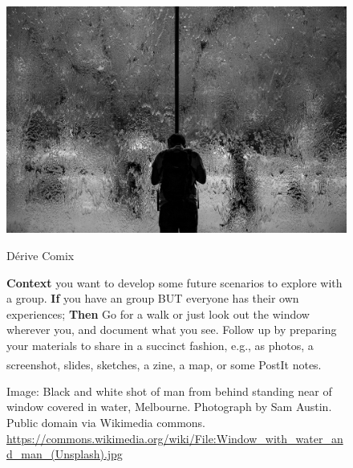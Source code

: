 \documentclass{article}
\begin{document}
\pagestyle{empty}
\thispagestyle{empty}
\pagecolor{Bittersweet!30}



\begin{figure}[p]
\begin{adjustbox}{minipage=[c]{\textwidth-10mm},margin=5mm 20mm 5mm 30mm, frame=1pt, bgcolor=almond,env=center}%
\begin{center}
\includegraphics[width=.6\paperwidth]{window_water.jpg}
\end{center}

\begin{center}
\begin{minipage}[t]{0.7\paperwidth}\raggedright
\medskip
  
{\huge Dérive Comix}
\bigskip

\Large
\textbf{Context} you want to develop some future scenarios to explore with a group.\newline
\textbf{If} you have an group BUT everyone has their own experiences;\newline
\textbf{Then} Go for a walk or just look out the window wherever you, and document what you see. Follow up by preparing your materials to share in a succinct fashion, e.g., as photos, a screenshot, slides, sketches, a zine, a map, or some PostIt\textsuperscript{\textregistered} notes.\newline
\end{minipage}
\end{center}
\caption*{Image: Black and white shot of man from behind standing near of window covered in water, Melbourne.  Photograph by Sam Austin.  Public domain via Wikimedia commons.\newline 
\url{https://commons.wikimedia.org/wiki/File:Window_with_water_and_man_(Unsplash).jpg}}
\end{adjustbox}
\end{figure}
\end{document}

